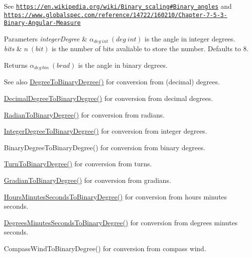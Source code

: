 See \href{https://en.wikipedia.org/wiki/Binary_scaling#Binary_angles}{\tt https\+://en.\+wikipedia.\+org/wiki/\+Binary\+\_\+scaling\#\+Binary\+\_\+angles} and \href{https://www.globalspec.com/reference/14722/160210/Chapter-7-5-3-Binary-Angular-Measure}{\tt https\+://www.\+globalspec.\+com/reference/14722/160210/\+Chapter-\/7-\/5-\/3-\/\+Binary-\/\+Angular-\/\+Measure} 
\begin{DoxyParams}{Parameters}
{\em integer\+Degree} & $\alpha_{deg\ int}\ (deg\ int)$ is the angle in integer degrees. \\
\hline
{\em bits} & $n\ (bit)$ is the number of bits avaliable to store the number. Defaults to 8. \\
\hline
\end{DoxyParams}
\begin{DoxyReturn}{Returns}
$\alpha_{deg\ bin}\ (brad)$ is the angle in binary degrees. 
\end{DoxyReturn}
\begin{DoxySeeAlso}{See also}
\mbox{\hyperlink{group___e_g_x_math-_angle_conversions-_degree_gacd1e3dc5194e89426a899a7cac4874f8}{Degree\+To\+Binary\+Degree()}} for conversion from (decimal) degrees. 

\mbox{\hyperlink{group___e_g_x_math-_angle_conversions-_decimal_degree_gaceec7ae7988c7f342d0b0fa6940720a1}{Decimal\+Degree\+To\+Binary\+Degree()}} for conversion from decimal degrees. 

\mbox{\hyperlink{group___e_g_x_math-_angle_conversions-_radian_ga13311d9b6977d514f1d6c336e7c0162b}{Radian\+To\+Binary\+Degree()}} for conversion from radians. 

\mbox{\hyperlink{group___e_g_x_math-_angle_conversions-_integer_degree_ga694bbfe624c3c14e97ce6155ca9bc44d}{Integer\+Degree\+To\+Binary\+Degree()}} for conversion from integer degrees. 

Binary\+Degree\+To\+Binary\+Degree() for conversion from binary degrees. 

\mbox{\hyperlink{group___e_g_x_math-_angle_conversions-_turn_ga678efb8f5c3958351fc3f1dfaf117b28}{Turn\+To\+Binary\+Degree()}} for conversion from turns. 

\mbox{\hyperlink{group___e_g_x_math-_angle_conversions-_gradian_ga6bf31920148bfd61f1f06eb961c3f62b}{Gradian\+To\+Binary\+Degree()}} for conversion from gradians. 

\mbox{\hyperlink{group___e_g_x_math-_angle_conversions-_hours_minutes_seconds_ga962a367fd21f0047eb0a7116a59c2bfc}{Hours\+Minutes\+Seconds\+To\+Binary\+Degree()}} for conversion from hours minutes seconds. 

\mbox{\hyperlink{group___e_g_x_math-_angle_conversions-_degrees_minutes_seconds_ga838c47916ce872cab2dfecd5ccf0a6ee}{Degrees\+Minutes\+Seconds\+To\+Binary\+Degree()}} for conversion from degrees minutes seconds. 

Compass\+Wind\+To\+Binary\+Degree() for conversion from compass wind. 
\end{DoxySeeAlso}
